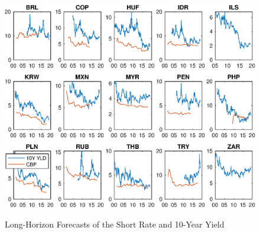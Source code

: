 \documentclass{article}
\begin{document}
\begin{figure}[tbph]
	\begin{center}
		\caption{Long-Horizon Forecasts of the Short Rate and 10-Year Yield}
		\label{fig:YLD10Y_CBP}
		\includegraphics[trim={0cm 0cm 0cm 0cm},clip,height=1\textheight,width=1.4\textwidth]{../Figures/Data/YLD10Y_CBP.eps} \\
	\end{center}
\end{figure}
\end{document}
